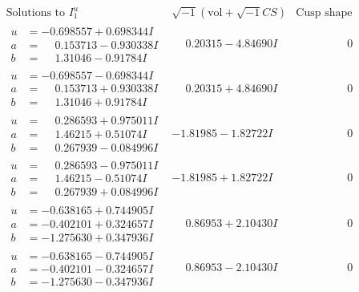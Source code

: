 \documentclass[1p]{elsarticle_modified}
\theoremstyle{definition}
\newcommand{\I}{\sqrt{-1}}
\begin{document}
$$\begin{array}{c|c|c}  
\text{Solutions to }I^u_{1}& \I (\text{vol} + \sqrt{-1}CS) & \text{Cusp shape}\\
 \hline 
\begin{aligned}
u &= -0.698557 + 0.698344 I \\
a &= \phantom{-}0.153713 - 0.930338 I \\
b &= \phantom{-}1.31046 - 0.91784 I\end{aligned}
 & \phantom{-}0.20315 - 4.84690 I & \phantom{-0.000000 } 0 \\ \hline\begin{aligned}
u &= -0.698557 - 0.698344 I \\
a &= \phantom{-}0.153713 + 0.930338 I \\
b &= \phantom{-}1.31046 + 0.91784 I\end{aligned}
 & \phantom{-}0.20315 + 4.84690 I & \phantom{-0.000000 } 0 \\ \hline\begin{aligned}
u &= \phantom{-}0.286593 + 0.975011 I \\
a &= \phantom{-}1.46215 + 0.51074 I \\
b &= \phantom{-}0.267939 - 0.084996 I\end{aligned}
 & -1.81985 - 1.82722 I & \phantom{-0.000000 } 0 \\ \hline\begin{aligned}
u &= \phantom{-}0.286593 - 0.975011 I \\
a &= \phantom{-}1.46215 - 0.51074 I \\
b &= \phantom{-}0.267939 + 0.084996 I\end{aligned}
 & -1.81985 + 1.82722 I & \phantom{-0.000000 } 0 \\ \hline\begin{aligned}
u &= -0.638165 + 0.744905 I \\
a &= -0.402101 + 0.324657 I \\
b &= -1.275630 + 0.347936 I\end{aligned}
 & \phantom{-}0.86953 + 2.10430 I & \phantom{-0.000000 } 0 \\ \hline\begin{aligned}
u &= -0.638165 - 0.744905 I \\
a &= -0.402101 - 0.324657 I \\
b &= -1.275630 - 0.347936 I\end{aligned}
 & \phantom{-}0.86953 - 2.10430 I & \phantom{-0.000000 } 0 \\ \hline\begin{aligned}

\end{aligned}
\end{array}$$
\end{document}
